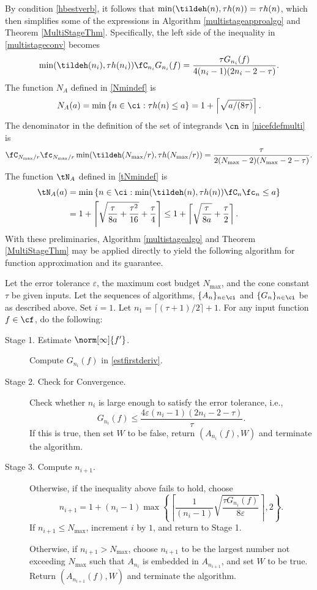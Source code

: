 By condition \eqref{hbestverb}, it follows that $\min(\tildeh(n),\tau h(n))=\tau h(n)$, which then simplifies some of the expressions in Algorithm \ref{multistageapproalgo} and Theorem \ref{MultiStageThm}.  Specifically, the left side of the inequality in \eqref{multistageconv} becomes
\[
\min(\tildeh(n_i),\tau h(n_i))\fC_{n_i} G_{n_i}(f) = \frac{\tau  G_{n_i}(f) } {4(n_i-1)(2n_i-2 -\tau)}.
\]
The function $N_A$ defined in \eqref{Nmindef} is
\[
N_{A}(a)= \min\left\{ n \in \ci : \tau h(n) \le a \right\} = 1+ \left \lceil \sqrt{a/(8\tau)}\right \rceil.
\]
The denominator in the definition of the set of integrands $\cn$ in \eqref{nicefdefmulti} is
\[
\fC_{N_{\max}/r} \fc_{N_{\max}/r} \min(\tildeh(N_{\max}/r),\tau h(N_{\max}/r)) =
\frac{\tau}{2 (N_{\max}-2)(N_{\max}-2 -\tau)}.
\]
The function $\tN_A$ defined in \eqref{tNmindef} is
\begin{align*} \label{tNmindef}
\tN_A(a) &= \min\left\{ n \in \ci : \min(\tildeh(n),\tau h(n))\fC_n\fc_n \le a \right\} \\
&= 1+ \left \lceil \sqrt{\frac{\tau}{8a} + \frac{\tau^2}{16}} +\frac{\tau}{4} \right \rceil \le 1+ \left \lceil\sqrt{\frac{\tau}{8a}} + \frac{\tau}{2} \right \rceil.
\end{align*}
With these preliminaries, Algorithm \ref{multistagealgo} and Theorem \ref{MultiStageThm} may be applied directly to  yield the following algorithm for function approximation and its guarantee.

\begin{algo} \label{multistageapproalgo}
Let the error tolerance $\varepsilon$, the maximum cost budget $N_{\max}$, and the cone constant $\tau$ be given inputs. Let the sequences of algorithms, $\{A_n\}_{n \in \ci}$ and  $\{G_n\}_{n \in \ci}$ be as described above.  Set $i=1$.  Let $n_1=\lceil (\tau+1)/2\rceil + 1$. For any input function $f \in \cf$, do the following:
\begin{description}

\item [Stage 1. Estimate {$\norm[\infty]{f'} $}.]
Compute $G_{n_i}(f)$ in \eqref{estfirstderiv}.

\item [Stage 2. Check for Convergence.]
Check whether $n_i$ is large enough to satisfy the error tolerance, i.e.,
$$
G_{n_i}(f) \le \frac{4\varepsilon (n_i-1)(2n_i-2 -\tau)}{\tau} .
$$
If this is true, then set $W$ to be false, return $(A_{n_i}(f),W)$ and terminate the algorithm.

\item[Stage 3. Compute $n_{i+1}$.]  Otherwise, if the inequality above fails to hold,
choose
$$
n_{i+1}=1+ (n_i-1)\max\left\{\left\lceil\frac{1}{(n_i-1)}\sqrt{\frac{\tau G_{n_i}(f)}{8\varepsilon}}\right\rceil,2\right\}.
$$
If $n_{i+1} \le N_{\max}$, increment $i$ by $1$, and return to Stage 1.

Otherwise, if $n_{i+1} > N_{\max}$, choose $n_{i+1}$ to be the largest number not exceeding $N_{\max}$ such that $A_{n_{i}}$ is embedded in $A_{n_{i+1}}$, and set $W$ to be true. Return $(A_{n_{i+1}}(f),W)$ and terminate the algorithm.
\end{description}
\end{algo}

